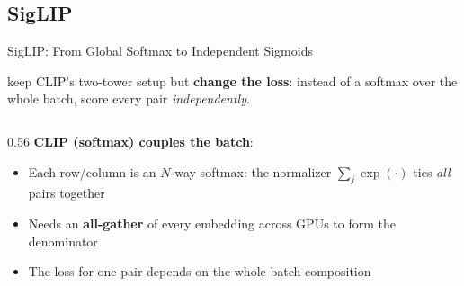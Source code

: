\subsection{SigLIP}

\begin{frame}{SigLIP: From Global Softmax to Independent Sigmoids}

  \cite{zhai2023siglip} keep CLIP's two-tower setup but \textbf{change the loss}: instead of a softmax over the whole batch, score every pair \emph{independently}.

  \vspace{0.3em}
  \begin{columns}
    \begin{column}{0.56\textwidth}
      \textbf{CLIP (softmax) couples the batch}:
      \begin{itemize}
        \item Each row/column is an $N$-way softmax: the normalizer $\sum_j \exp(\cdot)$ ties \emph{all} pairs together
        \item Needs an \textbf{all-gather} of every embedding across GPUs to form the denominator
        \item The loss for one pair depends on the whole batch composition
      \end{itemize}


\end{column}
\end{columns}
\end{frame}
